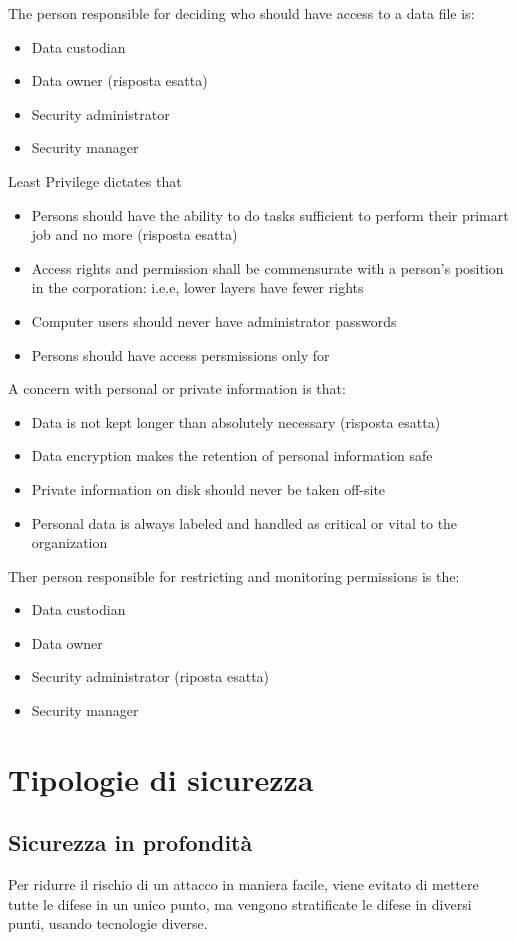 The person responsible for deciding who should have access to a data file is:
\begin{itemize}
  \item Data custodian
  \item Data owner (risposta esatta)
  \item Security administrator
  \item Security manager
\end{itemize}


Least Privilege dictates that
\begin{itemize}
  \item Persons should have the ability to do tasks sufficient to perform their 
  primart job and no more (risposta esatta)
  \item Access rights and permission shall be commensurate with a person's 
  position in the corporation: i.e.e, lower layers have fewer rights
  \item Computer users should never have administrator passwords
  \item Persons should have access persmissions only for %
\end{itemize}


A concern with personal or private information is that:
\begin{itemize}
  \item Data is not kept longer than absolutely necessary (risposta esatta)
  \item Data encryption makes the retention of personal information safe
  \item Private information on disk should never be taken off-site
  \item Personal data is always labeled and handled as critical or vital to the 
  organization
\end{itemize}


Ther person responsible for restricting and monitoring permissions is the:
\begin{itemize}
  \item Data custodian
  \item Data owner
  \item Security administrator (riposta esatta)
  \item Security manager
\end{itemize}

\section{Tipologie di sicurezza}

\subsection{Sicurezza in profondità}

Per ridurre il rischio di un attacco in maniera facile, viene evitato di 
mettere tutte le difese in un unico punto, ma vengono stratificate le difese in 
diversi punti, usando tecnologie diverse.